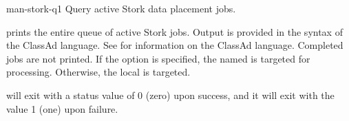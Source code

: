 \begin{ManPage}{}{man-stork-q}{1}
{Query active Stork data placement jobs.}

\Synopsis {}
\ToolArgsBase

\Storkname


\Description 

 prints the entire queue of active Stork jobs.
Output is provided in the syntax of the ClassAd language.
See  for information
on the ClassAd language.  Completed jobs are not printed.
If the  option is specified, the named  is targeted
for processing.  Otherwise, the local  is targeted.


\begin{Options}
	\ToolArgsBaseDesc
	\StorknameDesc
\end{Options}

\ExitStatus

 will exit with a status value of 0 (zero) upon success,
and it will exit with the value 1 (one) upon failure.

\end{ManPage}
